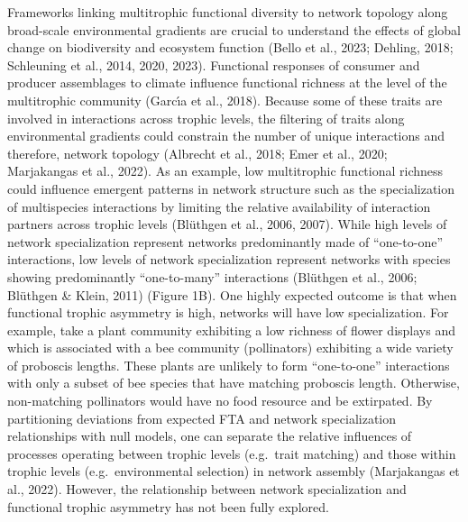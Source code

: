 \documentclass[
]{agujournal2019}
\begin{document}
Frameworks linking multitrophic functional diversity to network topology
along broad-scale environmental gradients are crucial to understand the
effects of global change on biodiversity and ecosystem function (Bello
et al., 2023; Dehling, 2018; Schleuning et al., 2014, 2020, 2023).
Functional responses of consumer and producer assemblages to climate
influence functional richness at the level of the multitrophic community
(Garcı́a et al., 2018). Because some of these traits are involved in
interactions across trophic levels, the filtering of traits along
environmental gradients could constrain the number of unique
interactions and therefore, network topology (Albrecht et al., 2018;
Emer et al., 2020; Marjakangas et al., 2022). As an example, low
multitrophic functional richness could influence emergent patterns in
network structure such as the specialization of multispecies
interactions by limiting the relative availability of interaction
partners across trophic levels (Blüthgen et al., 2006, 2007). While high
levels of network specialization represent networks predominantly made
of ``one-to-one'' interactions, low levels of network specialization
represent networks with species showing predominantly ``one-to-many''
interactions (Blüthgen et al., 2006; Blüthgen \& Klein, 2011) (Figure
1B). One highly expected outcome is that when functional trophic
asymmetry is high, networks will have low specialization. For example,
take a plant community exhibiting a low richness of flower displays and
which is associated with a bee community (pollinators) exhibiting a wide
variety of proboscis lengths. These plants are unlikely to form
``one-to-one'' interactions with only a subset of bee species that have
matching proboscis length. Otherwise, non-matching pollinators would
have no food resource and be extirpated. By partitioning deviations from
expected FTA and network specialization relationships with null models,
one can separate the relative influences of processes operating between
trophic levels (e.g.~trait matching) and those within trophic levels
(e.g.~environmental selection) in network assembly (Marjakangas et al.,
2022). However, the relationship between network specialization and
functional trophic asymmetry has not been fully explored.
\end{document}
